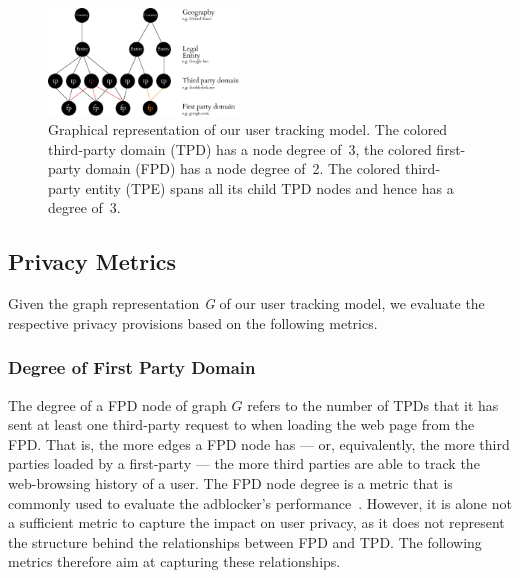 \documentclass[compsoc, conference, letterpaper, 10pt, times]{IEEEtran}
\begin{document}
\begin{figure}[tb!]
  \centering
  \includegraphics[width=0.45\textwidth]{figures/graph.eps}
  \caption{Graphical representation of our user tracking model. The colored third-party domain (TPD) has a node degree of~3, the colored first-party domain (FPD) has a node degree of~2. The colored third-party entity (TPE) spans all its child TPD nodes and hence has a degree of~3.}
  \label{fig:graph}
\end{figure}



\subsection{Privacy Metrics}

Given the graph representation \emph{G} of our user tracking model, we evaluate the respective privacy provisions based on the following metrics.



\subsubsection{Degree of First Party Domain}
The degree of a FPD node of graph $G$ refers to the number of TPDs that it has sent at least one third-party request to when loading the web page from the FPD. That is, the more edges a FPD node has --- or, equivalently, the more third parties loaded by a first-party --- the more third parties are able to track the web-browsing history of a user. The FPD node degree is a metric that is commonly used to evaluate the adblocker's performance~\cite{ruffel2015}. However, it is alone not a sufficient metric to capture the impact on user privacy, as it does not represent the structure behind the relationships between FPD and TPD. The following metrics therefore aim at capturing these relationships.
\end{document}
